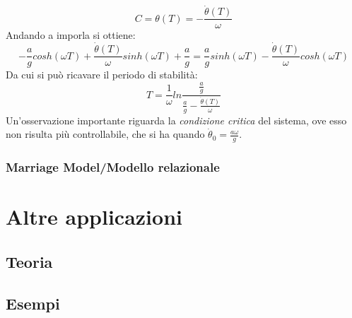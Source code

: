 \documentclass[12pt, a4paper]{book}
\theoremstyle{theorem}
\newtheorem{theorem}{Teorema}[section]
\begin{document}
				\begin{equation}
					C=\theta(T)=-\frac{\dot{\theta}(T)}{\omega}
				\end{equation}
				Andando a imporla si ottiene:
				\begin{equation}
					-\frac{a}{g}cosh(\omega T) + \frac{\dot{\theta}(T)}{\omega}sinh(\omega T) + \frac{a}{g} = \frac{a}{g}sinh(\omega T) - \frac{\dot{\theta}(T)}{\omega}cosh(\omega T)
				\end{equation}
				Da cui si può ricavare il periodo di stabilità:
				\begin{equation}
					T=\frac{1}{\omega}ln\frac{\frac{a}{g}}{\frac{a}{g}-\frac{\dot{\theta}(T)}{\omega}}
				\end{equation}
				Un'osservazione importante riguarda la \emph{condizione critica} del sistema, ove esso non risulta più controllabile, che si ha quando $\dot{\theta}_0=\frac{a\omega}{g}$.





			\subsection{Marriage Model/Modello relazionale}



	\chapter{Altre applicazioni} %
		\section{Teoria}

		\section{Esempi}


		
\end{document}
